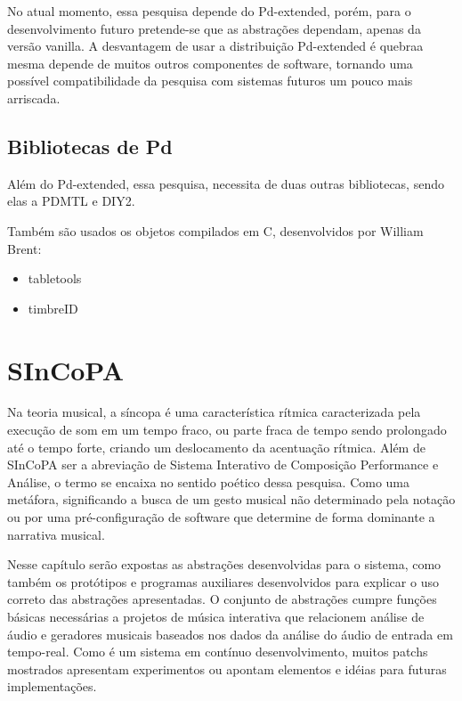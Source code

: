 \documentclass[draft]{ppgmus}
\begin{document}
No atual momento, essa pesquisa depende do Pd-extended, porém, para o desenvolvimento futuro pretende-se
que as abstrações dependam, apenas da versão vanilla. A desvantagem de usar a distribuição Pd-extended é quebraa mesma 
depende de muitos outros componentes de software, tornando uma possível compatibilidade da pesquisa com sistemas
futuros um pouco mais arriscada. 


\section{Bibliotecas de Pd}

Além do Pd-extended, essa pesquisa, necessita de duas outras bibliotecas, sendo elas a PDMTL e DIY2.

Também são usados os objetos compilados em C, desenvolvidos por William Brent:

\begin{itemize}
 \item tabletools
 \item timbreID
\end{itemize}












\newpage






\chapter{SInCoPA}
\label{chap:SInCoPA}


Na teoria musical, a síncopa é uma característica rítmica caracterizada pela execução de som em um tempo fraco, 
ou parte fraca de tempo sendo prolongado até o tempo forte, criando um deslocamento da acentuação rítmica. 
Além de SInCoPA ser a abreviação de Sistema Interativo de Composição Performance e Análise, o termo se encaixa
no sentido poético dessa pesquisa. Como uma metáfora, significando a busca de um gesto musical não determinado pela notação
ou por uma pré-configuração de software que determine de forma dominante a narrativa musical.

  Nesse capítulo serão expostas as abstrações desenvolvidas para o sistema, como também
os protótipos e programas auxiliares desenvolvidos para explicar o uso correto das 
abstrações apresentadas. O conjunto de abstrações cumpre funções básicas necessárias
a projetos de música interativa que relacionem análise de áudio e geradores musicais
baseados nos dados da análise do áudio de entrada em tempo-real. Como é um sistema 
em contínuo desenvolvimento, muitos patchs mostrados apresentam experimentos ou apontam
elementos e idéias para futuras implementações.
\end{document}
